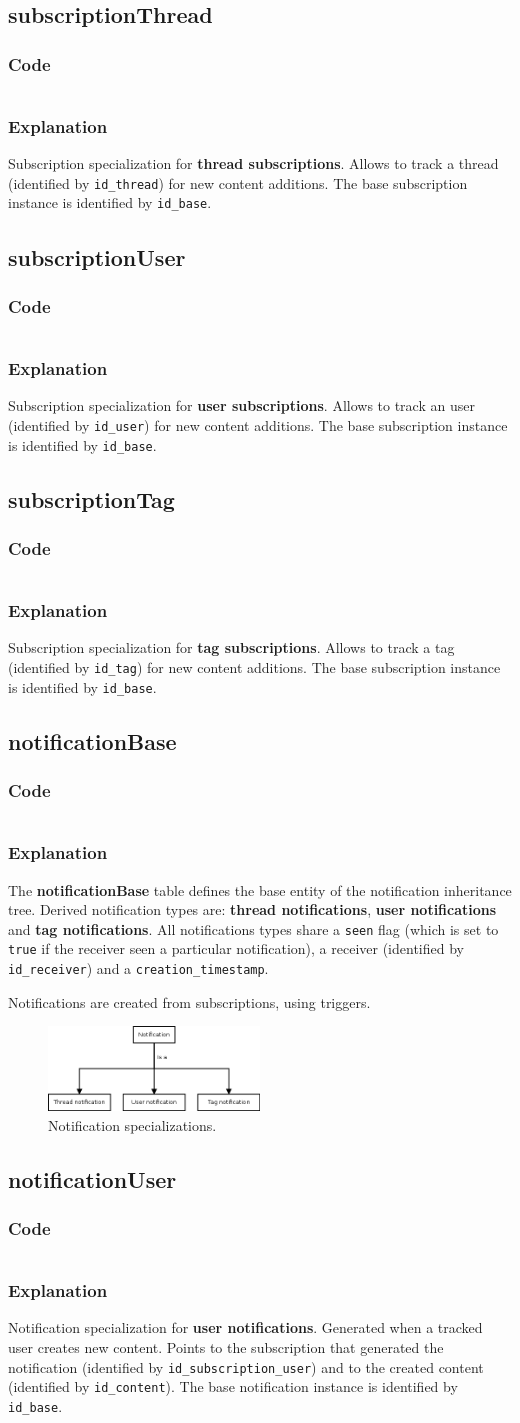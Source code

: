 \documentclass[12pt]{report}
\renewcommand\emph{\textbf}
\newcommand{\printSQLtest}[1]
{
    \inputminted[linenos, breaklines, breakbytoken, tabsize=4, fontsize=\footnotesize]{mysql}{#1}
}
\newcommand{\printSQLTablepage}[2]
{
    \newpage
    \subsection{#2}
    \subsubsection{Code}
    \printSQLtest{../sql/parts/#1}
    \subsubsection{Explanation}
}
\begin{document}
                \printSQLTablepage{12_tblSubscriptionThread.sql}{subscriptionThread}
                    Subscription specialization for \emph{thread subscriptions}. Allows to track a thread (identified by \texttt{id_thread}) for new content additions.
                    The base subscription instance is identified by \texttt{id_base}.


                \printSQLTablepage{13_tblSubscriptionUser.sql}{subscriptionUser}
                    Subscription specialization for \emph{user subscriptions}. Allows to track an user (identified by \texttt{id_user}) for new content additions.
                    The base subscription instance is identified by \texttt{id_base}.


                \printSQLTablepage{14_tblSubscriptionTag.sql}{subscriptionTag}
                    Subscription specialization for \emph{tag subscriptions}. Allows to track a tag (identified by \texttt{id_tag}) for new content additions.
                    The base subscription instance is identified by \texttt{id_base}.


                \printSQLTablepage{15_tblNotificationBase.sql}{notificationBase}
                    The \emph{notificationBase} table defines the base entity of the notification inheritance tree. Derived notification types are: \emph{thread notifications}, \emph{user notifications} and \emph{tag notifications}.
                    All notifications types share a \texttt{seen} flag (which is set to \texttt{true} if the receiver seen a particular notification), a receiver (identified by \texttt{id_receiver}) and a \texttt{creation_timestamp}.

                    Notifications are created from subscriptions, using triggers.

                    \begin{figure}[h]
                    \caption{Notification specializations.}
                    \centering
                    \includegraphics[width=0.5\textwidth]{td/15notificationbase}
                    \end{figure}


                \printSQLTablepage{16_tblNotificationUser.sql}{notificationUser}
                    Notification specialization for \emph{user notifications}. Generated when a tracked user creates new content. Points to the subscription that generated the notification (identified by \texttt{id_subscription_user}) and to the created content (identified by \texttt{id_content}).
                    The base notification instance is identified by \texttt{id_base}.
\end{document}
